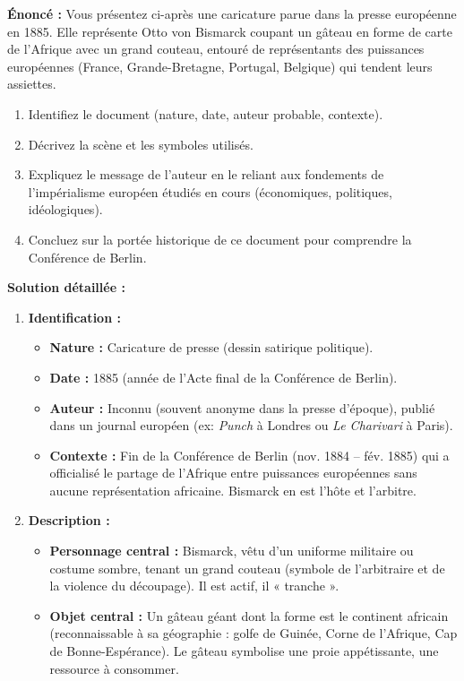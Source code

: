 \documentclass[11pt]{article}
\newcommand{\cle}[1]{{\popxbold\color{popdark}#1}}
\begin{document}
\begin{exoresolu}
\textbf{Énoncé :} Vous présentez ci-après une caricature parue dans la presse européenne en 1885. Elle représente Otto von Bismarck coupant un gâteau en forme de carte de l'Afrique avec un grand couteau, entouré de représentants des puissances européennes (France, Grande-Bretagne, Portugal, Belgique) qui tendent leurs assiettes.
\begin{enumerate}
    \item Identifiez le document (nature, date, auteur probable, contexte).
    \item Décrivez la scène et les symboles utilisés.
    \item Expliquez le message de l'auteur en le reliant aux \cle{fondements de l'impérialisme européen} étudiés en cours (économiques, politiques, idéologiques).
    \item Concluez sur la portée historique de ce document pour comprendre la \cle{Conférence de Berlin}.
\end{enumerate}
\tcblower
\textbf{Solution détaillée :}
\begin{enumerate}
    \item \textbf{Identification :}
    \begin{itemize}
        \item \textbf{Nature :} Caricature de presse (dessin satirique politique).
        \item \textbf{Date :} 1885 (année de l'Acte final de la Conférence de Berlin).
        \item \textbf{Auteur :} Inconnu (souvent anonyme dans la presse d'époque), publié dans un journal européen (ex: \emph{Punch} à Londres ou \emph{Le Charivari} à Paris).
        \item \textbf{Contexte :} Fin de la Conférence de Berlin (nov. 1884 – fév. 1885) qui a officialisé le partage de l'Afrique entre puissances européennes sans aucune représentation africaine. Bismarck en est l'hôte et l'arbitre.
    \end{itemize}
    \item \textbf{Description :}
    \begin{itemize}
        \item \textbf{Personnage central :} Bismarck, vêtu d'un uniforme militaire ou costume sombre, tenant un grand couteau (symbole de l'arbitraire et de la violence du découpage). Il est actif, il « tranche ».
        \item \textbf{Objet central :} Un gâteau géant dont la forme est le continent africain (reconnaissable à sa géographie : golfe de Guinée, Corne de l'Afrique, Cap de Bonne-Espérance). Le gâteau symbolise une proie appétissante, une ressource à consommer.

\end{itemize}
\end{enumerate}
\end{exoresolu}
\end{document}
